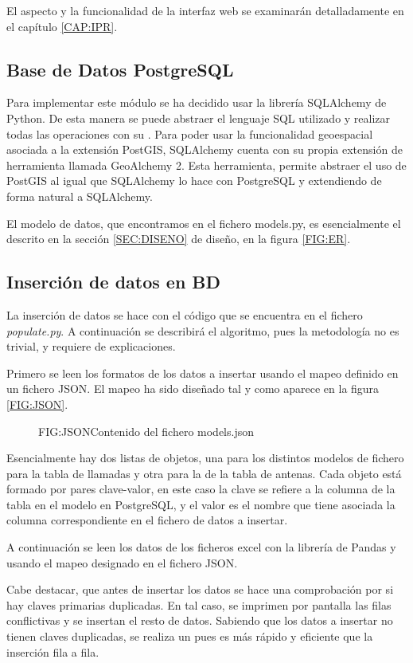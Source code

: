       El aspecto y la funcionalidad de la interfaz web se examinarán detalladamente en el capítulo \ref{CAP:IPR}.
      
      
    \subsection{Base de Datos PostgreSQL}
      Para implementar este módulo se ha decidido usar la librería SQLAlchemy\cite{sqlalchemy} de Python. De esta manera se puede abstraer el lenguaje SQL utilizado y realizar todas las operaciones con su . 
      Para poder usar la funcionalidad geoespacial asociada a la extensión PostGIS, SQLAlchemy cuenta con su propia extensión de herramienta llamada GeoAlchemy 2\cite{geoalchemy}. Esta herramienta, permite abstraer el uso de PostGIS al igual que SQLAlchemy lo hace con PostgreSQL y extendiendo de forma natural a SQLAlchemy.
      
      El modelo de datos, que encontramos en el fichero models.py, es esencialmente el descrito en la sección \ref{SEC:DISENO} de diseño, en la figura \ref{FIG:ER}.
    
    
    \subsection{Inserción de datos en BD\label{SS:IDAT}}
      La inserción de datos se hace con el código que se encuentra en el fichero \textit{populate.py}. A continuación se describirá el algoritmo, pues la metodología no es trivial, y requiere de explicaciones.
      
      Primero se leen los formatos de los datos a insertar usando el mapeo definido en un fichero JSON.
      El mapeo ha sido diseñado tal y como aparece en la figura \ref{FIG:JSON}. 
      
      \begin{figure}[Contenido del fichero models.json]{FIG:JSON}{Contenido del fichero models.json}
      \end{figure}
      
      Esencialmente hay dos listas de objetos, una para los distintos modelos de fichero para la tabla de llamadas y otra para la de la tabla de antenas.
      Cada objeto está formado por pares clave-valor, en este caso la clave se refiere a la columna de la tabla en el modelo en PostgreSQL, y el valor es el nombre que tiene asociada la columna correspondiente en el fichero de datos a insertar.
    
      A continuación se leen los datos de los ficheros excel con la librería de Pandas y usando el mapeo designado en el fichero JSON.

      Cabe destacar, que antes de insertar los datos se hace una comprobación por si hay claves primarias duplicadas. En tal caso, se imprimen por pantalla las filas conflictivas y se insertan el resto de datos.
      Sabiendo que los datos a insertar no tienen claves duplicadas, se realiza un  pues es más rápido y eficiente que la inserción fila a fila.

